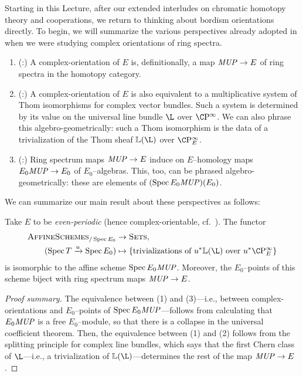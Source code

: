 Starting in this Lecture, after our extended interludes on chromatic homotopy theory and cooperations, we return to thinking about bordism orientations directly.  To begin, we will summarize the various perspectives already adopted in  when we were studying complex orientations of ring spectra.
\begin{enumerate}
\item (:) A complex-orientation of \(E\) is, definitionally, a map \(\mathit{MUP} \to E\) of ring spectra in the homotopy category.
\item (:) A complex-orientation of \(E\) is also equivalent to a multiplicative system of Thom isomorphisms for complex vector bundles.  Such a system is determined by its value on the universal line bundle \(\L\) over \(\CP^\infty\).  We can also phrase this algebro-geometrically: such a Thom isomorphism is the data of a trivialization of the Thom sheaf \(\ThomSheaf{\L}\) over \(\CP^\infty_E\).
\item (:) Ring spectrum maps \(\mathit{MUP} \to E\) induce on \(E\)--homology maps \(E_0 \mathit{MUP} \to E_0\) of \(E_0\)--algebras.  This, too, can be phrased algebro-geometrically: these are elements of \((\operatorname{Spec} E_0 \mathit{MUP})(E_0)\).
\end{enumerate}
We can summarize our main result about these perspectives as follows:
\begin{theorem}\label{BUZTriumvirate}
Take \(E\) to be \emph{even-periodic} (hence complex-orientable, cf.\ ).  The functor
\begin{align*}
\CatOf{AffineSchemes}_{/\Spec E_0} & \to \CatOf{Sets}, \\
(\Spec T \xrightarrow{u} \Spec E_0) & \mapsto \left\{ \text{trivializations of \(u^* \ThomSheaf{\L}\) over \(u^* \CP^\infty_E\)} \right\}
\end{align*}
is isomorphic to the affine scheme \(\operatorname{Spec} E_0 \mathit{MUP}\).  Moreover, the \(E_0\)--points of this scheme biject with ring spectrum maps \(\mathit{MUP} \to E\).
\end{theorem}
\begin{proof}[Proof summary]
The equivalence between (1) and (3)---i.e., between complex-orientations and \(E_0\)--points of \(\operatorname{Spec} E_0 \mathit{MUP}\)---follows from calculating that \(E_0 \mathit{MUP}\) is a free \(E_0\)--module, so that there is a collapse in the universal coefficient theorem.  Then, the equivalence between (1) and (2) follows from the splitting principle for complex line bundles, which says that the first Chern class of \(\L\)---i.e., a trivialization of \(\ThomSheaf{\L}\)---determines the rest of the map \(\mathit{MUP} \to E\).
\end{proof}

